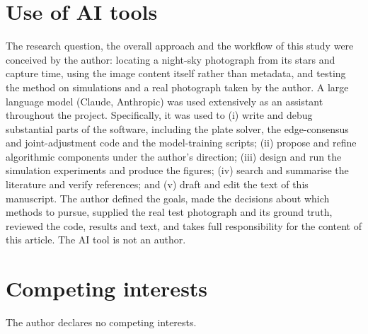 \documentclass[11pt,a4paper]{article}
\begin{document}
\section*{Use of AI tools}
The research question, the overall approach and the workflow of this study were conceived by the author: locating a night-sky photograph from its stars and capture time, using the image content itself rather than metadata, and testing the method on simulations and a real photograph taken by the author. A large language model (Claude, Anthropic) was used extensively as an assistant throughout the project. Specifically, it was used to (i) write and debug substantial parts of the software, including the plate solver, the edge-consensus and joint-adjustment code and the model-training scripts; (ii) propose and refine algorithmic components under the author's direction; (iii) design and run the simulation experiments and produce the figures; (iv) search and summarise the literature and verify references; and (v) draft and edit the text of this manuscript. The author defined the goals, made the decisions about which methods to pursue, supplied the real test photograph and its ground truth, reviewed the code, results and text, and takes full responsibility for the content of this article. The AI tool is not an author.

\section*{Competing interests}
The author declares no competing interests.
\end{document}
